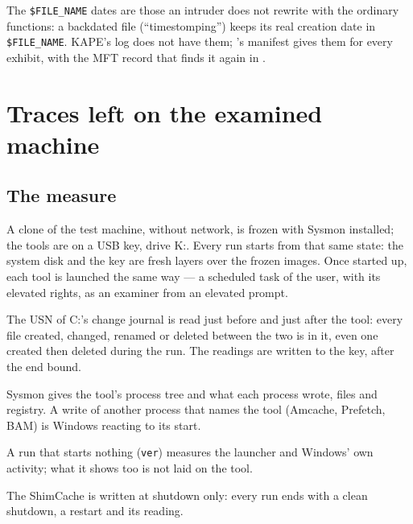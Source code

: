 \documentclass[11pt,a4paper,oneside]{report}
\begin{document}
\begin{note}
The \texttt{\$FILE\_NAME} dates are those an intruder does not rewrite with the
ordinary functions: a backdated file (``timestomping'') keeps its real creation
date in \texttt{\$FILE\_NAME}. KAPE's log does not have them; \wac{}'s manifest
gives them for every exhibit, with the MFT record that finds it again in
.
\end{note}

\chapter{Traces left on the examined machine}\label{chap:traces}

\section{The measure}

A clone of the test machine, without network, is frozen with Sysmon installed;
the tools are on a USB key, drive K:. Every run starts from that same state: the
system disk and the key are fresh layers over the frozen images. Once started
up, each tool is launched the same way --- a scheduled task of the user, with its
elevated rights, as an examiner from an elevated prompt.

\begin{description}[style=nextline,leftmargin=1em]
  \item[Files] The USN of C:'s change journal is read just before and just after
        the tool: every file created, changed, renamed or deleted between the two
        is in it, even one created then deleted during the run. The readings are
        written to the key, after the end bound.
  \item[Author] Sysmon gives the tool's process tree and what each process
        wrote, files and registry. A write of another process that names the
        tool (Amcache, Prefetch, BAM) is Windows reacting to its start.
  \item[Control] A run that starts nothing (\texttt{ver}) measures the launcher
        and Windows' own activity; what it shows too is not laid on the tool.
  \item[Deferred] The ShimCache is written at shutdown only: every run ends with
        a clean shutdown, a restart and its reading.
\end{description}
\end{document}
